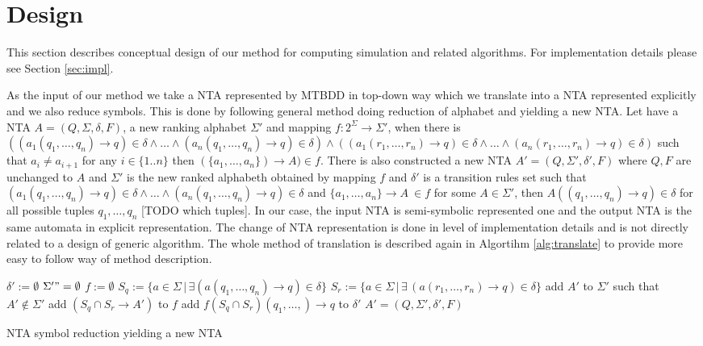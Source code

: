 \documentclass[a4paper, 12pt]{article}
\begin{document}
\section{Design}
\label{sec:design}

This section describes conceptual design of our method for computing simulation and related algorithms.
For implementation details please see Section \ref{sec:impl}.

As the input of our method we take a NTA represented by MTBDD in top-down way
which we translate into a NTA represented explicitly and we also reduce symbols.
This is done by following general method doing reduction of alphabet and yielding a new NTA.
Let have a NTA $A=(Q, \Sigma, \delta, F)$, a new ranking alphabet $\Sigma'$ and mapping $f: 2^\Sigma \rightarrow \Sigma'$,
when there is $((a_1(q_1,\ldots,q_n) \rightarrow q) \in \delta \wedge \ldots \wedge (a_n(q_1,\ldots,q_n) \rightarrow q) \in \delta) \wedge
((a_1(r_1,\ldots,r_n) \rightarrow q) \in \delta \wedge \ldots \wedge (a_n(r_1,\ldots,r_n) \rightarrow q) \in \delta)$
such that $a_i \neq a_{i+1}$ for any $i\in \{1..n\}$ then $(\{a_1, \ldots, a_n\}) \rightarrow A) \in f$.
There is also constructed a new NTA $A' = (Q, \Sigma', \delta', F)$ where $Q, F$ are unchanged to $A$ 
and $\Sigma'$ is the new ranked alphabeth obtained by mapping $f$ and $\delta'$ is a transition rules set such that
$(a_1(q_1, \ldots, q_n) \rightarrow q) \in \delta \wedge \ldots \wedge (a_n(q_1, \ldots, q_n) \rightarrow q) \in \delta$ and
$ \{a_1,\ldots,a_n\}  \rightarrow A~\in f$ for some $A \in \Sigma'$, then $A((q_1, \ldots, q_n) \rightarrow q) \in \delta$
for all possible tuples $q_1,\ldots,q_n$ [TODO which tuples].
In our case, the input NTA is semi-symbolic represented one and the output NTA is the same automata in explicit representation.
The change of NTA representation is done in level of implementation details and is not directly related to a design of generic algorithm.
The whole method of translation is described again in Algortihm \ref{alg:translate} to provide more easy to follow way of method description.

\begin{algorithm}[h]
\label{alg:translate}
    $\delta' := \emptyset $\;
    $\Sigma' "= \emptyset $\;
	$f := \emptyset$\;
    {
		{
			$S_q := \{ a\in \Sigma \,|\, \exists(a(q_1,\ldots,q_n) \rightarrow q) \in \delta\}$\;
			{
				$S_r := \{a\in \Sigma \,|\, \exists\, (a(r_1,\ldots,r_n) \rightarrow q) \in \delta\}$\;
				{
					add $A'$ to $\Sigma'$ such that $A' \not\in \Sigma'$\;
					add $(S_q \cap S_r \rightarrow A')$ to $f$\;
				}
				add $f(S_q \cap S_r)(q_1,\ldots,) \rightarrow q$ to $\delta'$\;
			}
		}
    }
	\Return $A' = (Q, \Sigma', \delta', F)$
\caption{NTA symbol reduction yielding a new NTA}
\end{algorithm}
\end{document}
